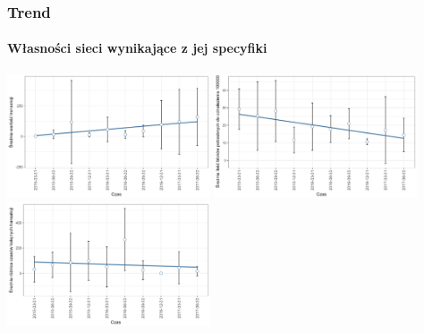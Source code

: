 \documentclass[]{beamer}
\newcommand{\sizequadsda}{0.45}
\begin{document}
\begin{frame}
 \frametitle{Trend}
 \framesubtitle{Własności sieci wynikające z jej specyfiki}
    \begin{minipage}{\textwidth}
 		  \includegraphics[width=\sizequadsda\textwidth]{pictures/wartosc_transakcji/wartosc_transakcji_sda.png}\quad  
  		 \includegraphics[width=\sizequadsda\textwidth]{pictures/ilosc_blokow/ilosc_blokow_sda.png}  \\
  		 \includegraphics[width=\sizequadsda\textwidth]{pictures/roznica_czasow/roznica_czasow_sda.png}\quad

\end{minipage}
\end{frame}
\end{document}
